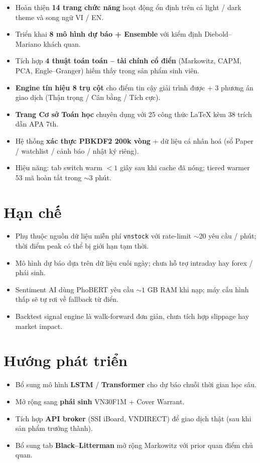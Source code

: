 \documentclass[12pt,a4paper,openany,oneside]{report}
\numberwithin{equation}{chapter}
\begin{document}
\begin{itemize}[leftmargin=22pt,topsep=2pt,itemsep=4pt]
  \item Hoàn thiện \textbf{14 trang chức năng} hoạt động ổn định trên
   cả light / dark theme và song ngữ VI / EN.
  \item Triển khai \textbf{8 mô hình dự báo + Ensemble} với kiểm định
   Diebold--Mariano khách quan.
  \item Tích hợp \textbf{4 thuật toán toán -- tài chính cổ điển}
   (Markowitz, CAPM, PCA, Engle--Granger) hiếm thấy trong sản phẩm
   sinh viên.
  \item \textbf{Engine tín hiệu 8 trụ cột} cho điểm tin cậy giải trình
   được + 3 phương án giao dịch (Thận trọng / Cân bằng / Tích cực).
  \item \textbf{Trang Cơ sở Toán học} chuyên dụng với 25 công thức
   \LaTeX{} kèm 38 trích dẫn APA 7th.
  \item Hệ thống \textbf{xác thực PBKDF2 200k vòng} + dữ liệu cá nhân
   hoá (sổ Paper / watchlist / cảnh báo / nhật ký riêng).
  \item Hiệu năng: tab switch warm $<1$ giây sau khi cache đã nóng;
   tiered warmer 53 mã hoàn tất trong $\sim$3 phút.
\end{itemize}

\section{Hạn chế}

\begin{itemize}[leftmargin=22pt,topsep=2pt,itemsep=4pt]
  \item Phụ thuộc nguồn dữ liệu miễn phí \texttt{vnstock} với rate-limit
   $\sim$20 yêu cầu / phút; thời điểm peak có thể bị giới hạn tạm thời.
  \item Mô hình dự báo dựa trên dữ liệu cuối ngày; chưa hỗ trợ
   intraday hay forex / phái sinh.
  \item Sentiment AI dùng PhoBERT yêu cầu ${\sim}1$ GB RAM khi nạp; máy
   cấu hình thấp sẽ tự rơi về fallback từ điển.
  \item Backtest signal engine là walk-forward đơn giản, chưa tích hợp
   slippage hay market impact.
\end{itemize}

\section{Hướng phát triển}

\begin{itemize}[leftmargin=22pt,topsep=2pt,itemsep=4pt]
  \item Bổ sung mô hình \textbf{LSTM} / \textbf{Transformer} cho dự báo
   chuỗi thời gian học sâu.
  \item Mở rộng sang \textbf{phái sinh} VN30F1M + Cover Warrant.
  \item Tích hợp \textbf{API broker} (SSI iBoard, VNDIRECT) để giao
   dịch thật (sau khi sản phẩm trưởng thành).
  \item Bổ sung tab \textbf{Black--Litterman} mở rộng Markowitz với prior
   quan điểm chủ quan.
\end{itemize}
\end{document}

